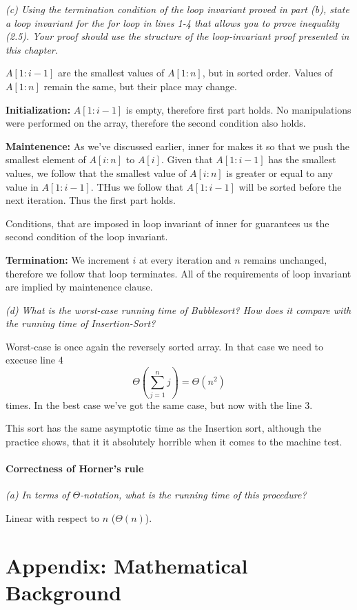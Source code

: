 \documentclass[11pt,oneside,titlepage]{book}
\begin{document}
\textit{(c) Using the termination condition of the loop invariant proved in part (b), state
  a loop invariant for the for loop in lines 1-4 that allows you to prove inequality
  (2.5). Your proof should use the structure of the loop-invariant proof presented
  in this chapter.}


$A[1:i - 1]$ are the smallest values of $A[1:n]$, but in sorted order.
Values of $A[1:n]$ remain the same, but their place may change.

\textbf{Initialization: }
$A[1:i - 1]$ is empty, therefore first part holds. No manipulations were performed on the
array, therefore the second condition also holds.

\textbf{Maintenence: }
As we've discussed earlier, inner for makes it so that we push the smallest element of $A[i:n]$
to $A[i]$. Given that $A[1: i-1]$ has the smallest values, we follow that the smallest value
of $A[i:n]$ is greater or equal to any value in $A[1:i-1]$. THus we follow that $A[1:i - 1]$
will be sorted before the next iteration. Thus the first part holds.

Conditions, that are imposed in loop invariant of inner for guarantees us the second condition
of the loop invariant.

\textbf{Termination: }
We increment $i$ at every iteration and $n$ remains unchanged, therefore we follow that
loop terminates. All of the requirements of loop invariant are implied by maintenence clause.

\textit{(d) What is the worst-case running time of Bubblesort? How does it compare with
  the running time of Insertion-Sort?}

Worst-case is once again the reversely sorted array. In that case we need to
execuse line 4
$$\Theta(\sum_{j = 1}^n{j}) = \Theta(n^2)$$
times. In the best case we've got the same case, but now with the line 3.

This sort has the same asymptotic time as the Insertion sort, although the practice shows, that it
it absolutely horrible when it comes to the machine test.

\subsection{Correctness of Horner's rule}

\textit{(a) In terms of $\Theta$-notation, what is the running time of this procedure? }

Linear with respect to $n$ ($\Theta(n)$).


\part{Appendix: Mathematical Background}
\end{document}
